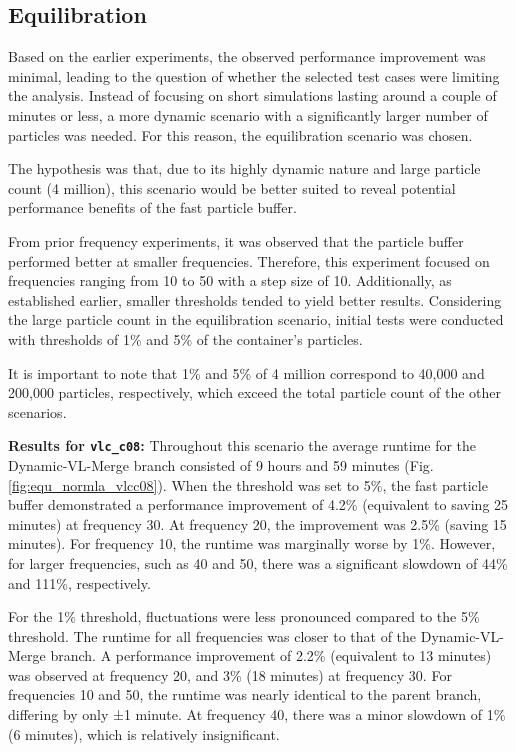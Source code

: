 \subsection{Equilibration}
 
Based on the earlier experiments, the observed performance improvement was minimal, leading to the question of whether the selected test cases were limiting the analysis. Instead of focusing on short simulations lasting around a couple of minutes or less, a more dynamic scenario with a significantly larger number of particles was needed. For this reason, the equilibration scenario was chosen.

The hypothesis was that, due to its highly dynamic nature and large particle count (4 million), this scenario would be better suited to reveal potential performance benefits of the fast particle buffer.

From prior frequency experiments, it was observed that the particle buffer performed better at smaller frequencies. Therefore, this experiment focused on frequencies ranging from 10 to 50 with a step size of 10. Additionally, as established earlier, smaller thresholds tended to yield better results. Considering the large particle count in the equilibration scenario, initial tests were conducted with thresholds of 1\% and 5\% of the container's particles. 

It is important to note that 1\% and 5\% of 4 million correspond to 40,000 and 200,000 particles, respectively, which exceed the total particle count of the other scenarios.

\textbf{Results for \texttt{vlc\_c08}:}  
Throughout this scenario the average runtime for the Dynamic-VL-Merge branch consisted of 9 hours and 59 minutes (Fig.\ref{fig:equ_normla_vlcc08}). When the threshold was set to 5\%, the fast particle buffer demonstrated a performance improvement of 4.2\% (equivalent to saving 25 minutes) at frequency 30. At frequency 20, the improvement was 2.5\% (saving 15 minutes). For frequency 10, the runtime was marginally worse by 1\%. However, for larger frequencies, such as 40 and 50, there was a significant slowdown of 44\% and 111\%, respectively.

For the 1\% threshold, fluctuations were less pronounced compared to the 5\% threshold. The runtime for all frequencies was closer to that of the Dynamic-VL-Merge branch. A performance improvement of 2.2\% (equivalent to 13 minutes) was observed at frequency 20, and 3\% (18 minutes) at frequency 30. For frequencies 10 and 50, the runtime was nearly identical to the parent branch, differing by only ±1 minute. At frequency 40, there was a minor slowdown of 1\% (6 minutes), which is relatively insignificant.

